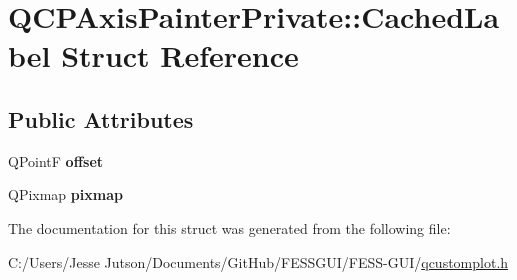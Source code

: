 \hypertarget{struct_q_c_p_axis_painter_private_1_1_cached_label}{}\section{Q\+C\+P\+Axis\+Painter\+Private\+:\+:Cached\+Label Struct Reference}
\label{struct_q_c_p_axis_painter_private_1_1_cached_label}
\subsection*{Public Attributes}
\begin{DoxyCompactItemize}
\item 
\hypertarget{struct_q_c_p_axis_painter_private_1_1_cached_label_a5f502db71c92e572f1e6f44f62c59d8e}{}\label{struct_q_c_p_axis_painter_private_1_1_cached_label_a5f502db71c92e572f1e6f44f62c59d8e} 
Q\+PointF {\bfseries offset}
\item 
\hypertarget{struct_q_c_p_axis_painter_private_1_1_cached_label_a461597cbd470914a9d24b64d16037a88}{}\label{struct_q_c_p_axis_painter_private_1_1_cached_label_a461597cbd470914a9d24b64d16037a88} 
Q\+Pixmap {\bfseries pixmap}
\end{DoxyCompactItemize}


The documentation for this struct was generated from the following file\+:\begin{DoxyCompactItemize}
\item 
C\+:/\+Users/\+Jesse Jutson/\+Documents/\+Git\+Hub/\+F\+E\+S\+S\+G\+U\+I/\+F\+E\+S\+S-\/\+G\+U\+I/\hyperlink{qcustomplot_8h}{qcustomplot.\+h}\end{DoxyCompactItemize}
